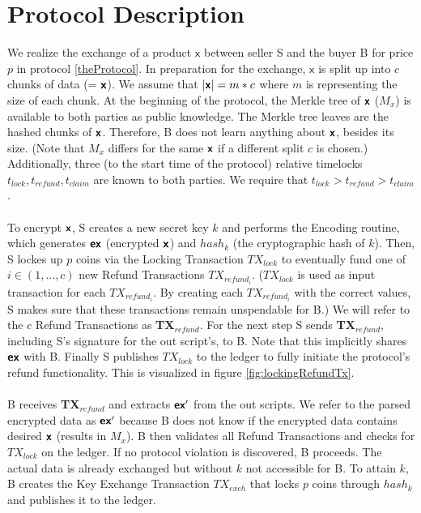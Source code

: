\documentclass{cacthesis}
\newcounter{protocol}
\begin{document}
        \section{Protocol Description}
        We realize the exchange of a product $\textsf{x}$ between seller S and the buyer B for price $p$ in protocol \ref{theProtocol}. In preparation for the exchange, $\textsf{x}$ is split up into $c$ chunks of data (= $\textsf{\textbf{x}}$). We assume that $|\textsf{\textbf{x}}| = m*c $ where $m$ is representing the size of each chunk. At the beginning of the protocol, the Merkle tree of $\textsf{\textbf{x}}$ ($M_x$) is available to both parties as public knowledge. The Merkle tree leaves are the hashed chunks of $\textsf{\textbf{x}}$. Therefore, B does not learn anything about $\textsf{\textbf{x}}$, besides its size. (Note that $M_x$ differs for the same $\textsf{\textbf{x}}$ if a different split $c$ is chosen.) Additionally, three (to the start time of the protocol) relative timelocks $t_{lock}, t_{refund}, t_{claim}$ are known to both parties. We require that $t_{lock} > t_{refund} > t_{claim}$. \\\\
        To encrypt $\textsf{\textbf{x}}$, S creates a new secret key $k$ and performs the Encoding routine, which generates $\textsf{\textbf{ex}}$ (encrypted $\textsf{\textbf{x}}$) and $hash_k$ (the cryptographic hash of $k$). Then, S lockes up $p$ coins via the Locking Transaction $TX_{lock}$ to eventually fund one of $i \in (1, ..., c)$ new Refund Transactions $TX_{{refund}_i}$. ($TX_{lock}$  is used as input transaction for each $TX_{{refund}_i}$. By creating each $TX_{{refund}_i}$ with the correct values, S makes sure that these transactions remain unspendable for B.) We will refer to the $c$ Refund Transactions as \textbf{TX$_{{refund}}$}. For the next step S sends \textbf{TX$_{{refund}}$}, including S's signature for the out script's, to B. Note that this implicitly shares $\textsf{\textbf{ex}}$ with B. Finally S publishes $TX_{lock}$ to the ledger to fully initiate the protocol's refund functionality. This is visualized in figure \ref{fig:lockingRefundTx}. \\\\
        B receives \textbf{TX$_{{refund}}$} and extracts $\textsf{\textbf{ex}}'$ from the out scripts. We refer to the parsed encrypted data as $\textsf{\textbf{ex}}'$ because B does not know if the encrypted data contains desired $\textsf{\textbf{x}}$ (results in $M_x$). B then validates all Refund Transactions and checks for $TX_{lock}$ on the ledger. If no protocol violation is discovered, B proceeds. The actual data is already exchanged but without $k$ not accessible for B. To attain $k$, B creates the Key Exchange Transaction $TX_{exch}$ that locks $p$ coins through $hash_k$ and publishes it to the ledger. \\\\
\end{document}
